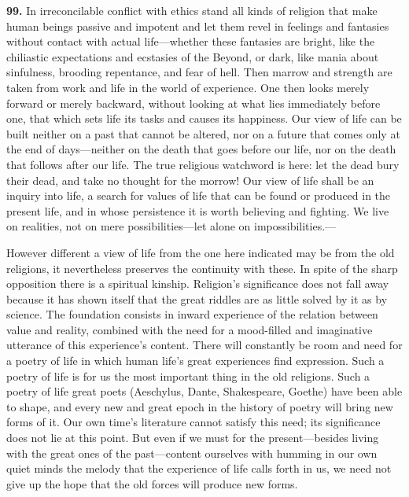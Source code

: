 \documentclass[12pt,a4paper]{book}
\newcommand{\opage}[1]{\marginnote{\footnotesize\textit{[#1]}}}
\begin{document}
\noindent\textbf{99.} In irreconcilable conflict with ethics stand all kinds of religion that make human beings
passive and impotent and let them revel in feelings and fantasies without contact with actual life---whether these
fantasies are bright, like the chiliastic expectations and ecstasies of the Beyond, or dark, like 
\opage{225}mania about
sinfulness, brooding repentance, and fear of hell. Then marrow and strength are taken from work and life in the
world of experience. One then looks merely forward or merely backward, without looking at what lies immediately
before one, that which sets life its tasks and causes its happiness. Our view of life can be built neither on a
past that cannot be altered, nor on a future that comes only at the end of days---neither on the death that goes
before our life, nor on the death that follows after our life. The true religious watchword is here: let the dead
bury their dead, and take no thought for the morrow! Our view of life shall be an inquiry into life, a search for
values of life that can be found or produced in the present life, and in whose persistence it is worth believing
and fighting. We live on realities, not on mere possibilities---let alone on impossibilities.---

However different a view of life from the one here indicated may be from the old religions, it nevertheless
preserves the continuity with these. In spite of the sharp opposition there is a spiritual kinship. Religion's
significance does not fall away because it has shown itself that the great riddles are as little solved by it as
by science. The foundation consists in inward experience of the relation between value and reality, combined with
the need for a mood-filled and imaginative utterance of this experience's content. There will constantly be room
and need for a poetry of life in which human life's great experiences find expression. Such a poetry of life is
for us the most important thing in the old religions. Such a poetry of life great poets (Aeschylus, Dante,
Shakespeare, Goethe) have been able to shape, and every new and great epoch in the history of poetry will bring
new forms of it. Our own time's literature cannot satisfy this need; its significance does not lie at this point.
But even if we must for the present---besides living with the great ones of the past---content ourselves with
humming in our own quiet minds the melody that the experience of life calls forth in us, we need not give up the
hope that the old forces will produce new forms.
\end{document}
